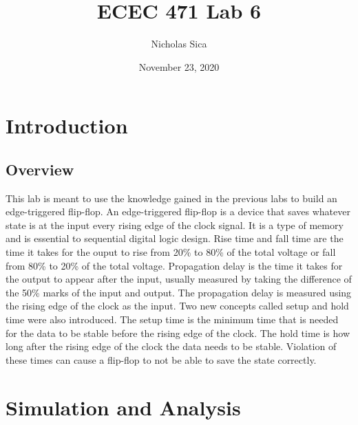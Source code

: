 \documentclass[12pt]{article}
\begin{document}
\title{ECEC 471 Lab 6}
\author{Nicholas Sica}
\date{November 23, 2020}
\maketitle

\section{Introduction}
\subsection{Overview}
This lab is meant to use the knowledge gained in the previous labs to build an edge-triggered flip-flop.
An edge-triggered flip-flop is a device that saves whatever state is at the input every rising edge of
the clock signal. It is a type of memory and is essential to sequential digital logic design.
Rise time and fall time are the time it takes for the ouput to rise from 20\% to 80\% of the total
voltage or fall from 80\% to 20\% of the total voltage. Propagation delay is the time it takes for
the output to appear after the input, usually measured by taking the difference of the 50\% marks
of the input and output. The propagation delay is measured using the rising edge of the clock as
the input. Two new concepts called setup and hold time were also introduced. The setup time is the
minimum time that is needed for the data to be stable before the rising edge of the clock. The hold
time is how long after the rising edge of the clock the data needs to be stable. Violation of these
times can cause a flip-flop to not be able to save the state correctly.
\section{Simulation and Analysis}
\end{document}
